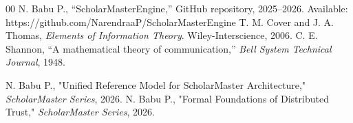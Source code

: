 \documentclass[conference]{IEEEtran}
\begin{document}
\begin{thebibliography}{00}
 N. Babu P., ``ScholarMasterEngine,'' GitHub repository, 2025--2026. Available: https://github.com/NarendraaP/ScholarMasterEngine
 T. M. Cover and J. A. Thomas, \textit{Elements of Information Theory}. Wiley-Interscience, 2006.
 C. E. Shannon, ``A mathematical theory of communication,'' \textit{Bell System Technical Journal}, 1948.


 N. Babu P., "Unified Reference Model for ScholarMaster Architecture," \textit{ScholarMaster Series}, 2026.
 N. Babu P., "Formal Foundations of Distributed Trust," \textit{ScholarMaster Series}, 2026.
\end{thebibliography}
\end{document}
